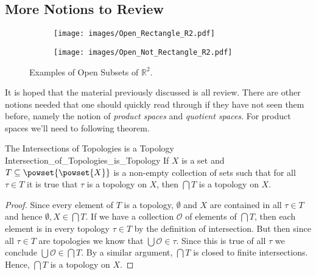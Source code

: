 \documentclass{book}                                                           %
\begin{document}
            \subsection{More Notions to Review}
                \begin{figure}
                    \centering
                    \captionsetup{type=figure}
                    \begin{subfigure}[b]{0.49\textwidth}
                        \centering
                        \texttt{[image: images/Open\_Rectangle\_R2.pdf]}
                        \label{fig:Open_Rectangle_in_R2}
                    \end{subfigure}
                    \begin{subfigure}[b]{0.49\textwidth}
                        \centering
                        \texttt{[image: images/Open\_Not\_Rectangle\_R2.pdf]}
                        \label{fig:Open_Subset_Not_Product}
                    \end{subfigure}
                    \caption{Examples of Open Subsets of $\mathbb{R}^{2}$.}
                    \label{fig:Point_Set_Top_Open_Subsets_R2}
                \end{figure}
                It is hoped that the material previously discussed is all
                review. There are other notions needed that one should quickly
                read through if they have not seen them before, namely the
                notion of \textit{product spaces} and \textit{quotient spaces}.
                For product spaces we'll need to following theorem.
                \begin{ltheorem}{The Intersections of Topologies is a Topology}
                                {Intersection_of_Topologies_is_Topology}
                    If $X$ is a set and $T\subseteq\powset{\powset{X}}$ is a
                    non-empty collection of sets such that for all $\tau\in{T}$
                    it is true that $\tau$ is a topology on $X$, then
                    $\bigcap{T}$ is a topology on $X$.
                \end{ltheorem}
                \begin{proof}
                    Since every element of $T$ is a topology, $\emptyset$ and
                    $X$ are contained in all $\tau\in{T}$ and hence
                    $\emptyset,X\in\bigcap{T}$. If we have a collection
                    $\mathcal{O}$ of elements of $\bigcap{T}$, then each element
                    is in every topology $\tau\in{T}$ by the definition of
                    intersection. But then since all $\tau\in{T}$ are topologies
                    we know that $\bigcup\mathcal{O}\in\tau$. Since this is true
                    of all $\tau$ we conclude $\bigcup\mathcal{O}\in\bigcap{T}$.
                    By a similar argument, $\bigcap{T}$ is closed to finite
                    intersections. Hence, $\bigcap{T}$ is a topology on $X$.
                \end{proof}
\end{document}
